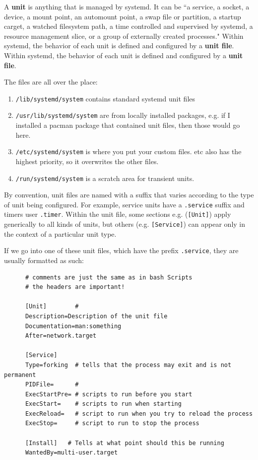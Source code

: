   \begin{definition}
    \label{def:systemd-unit}
    A \textbf{unit} is anything that is managed by systemd. It can be ``a service, a socket, a device, a mount point, an automount point, a swap file or partition, a startup carget, a watched filesystem path, a time controlled and supervised by systemd, a resource management slice, or a group of externally created processes." Within systemd, the behavior of each unit is defined and configured by a \textbf{unit file}. Within systemd, the behavior of each unit is defined and configured by a \textbf{unit file}. 

    The files are all over the place: 
      \begin{enumerate}
        \item \texttt{/lib/systemd/system} contains standard systemd unit files 
        \item \texttt{/usr/lib/systemd/system} are from locally installed packages, e.g. if I installed a pacman package that contained unit files, then those would go here. 
        \item \texttt{/etc/systemd/system} is where you put your custom files. etc also has the highest priority, so it overwrites the other files.  
        \item \texttt{/run/systemd/system} is a scratch area for transient units. 
      \end{enumerate}

    By convention, unit files are named with a suffix that varies according to the type of unit being configured. For example, service units have a \texttt{.service} suffix and timers user \texttt{.timer}. Within the unit file, some sections e.g. (\texttt{[Unit]}) apply generically to all kinds of units, but others (e.g. \texttt{[Service]}) can appear only in the context of a particular unit type. 

  \end{definition}

  \begin{example}
    \label{ex:service-unit-file}
    If we go into one of these unit files, which have the prefix \texttt{.service}, they are usually formatted as such: 

    \begin{lstlisting}
      # comments are just the same as in bash Scripts
      # the headers are important! 

      [Unit]        #  
      Description=Description of the unit file 
      Documentation=man:something 
      After=network.target

      [Service]
      Type=forking  # tells that the process may exit and is not permanent
      PIDFile=      # 
      ExecStartPre= # scripts to run before you start 
      ExecStart=    # scripts to run when starting 
      ExecReload=   # script to run when you try to reload the process
      ExecStop=     # script to run to stop the process 

      [Install]   # Tells at what point should this be running
      WantedBy=multi-user.target 

    \end{lstlisting} 
  \end{example}
  
